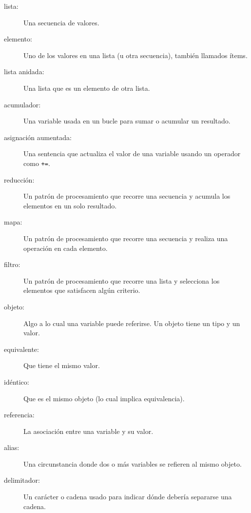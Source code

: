 \documentclass[10pt]{book}
\begin{document}
\begin{description}

\item[lista:] Una secuencia de valores.

\item[elemento:] Uno de los valores en una lista (u otra secuencia),
también llamados ítems.

\item[lista anidada:] Una lista que es un elemento de otra lista.

\item[acumulador:] Una variable usada en un bucle para sumar o
acumular un resultado.

\item[asignación aumentada:] Una sentencia que actualiza el valor
de una variable usando un operador como \verb"+=".

\item[reducción:] Un patrón de procesamiento que recorre una secuencia
y acumula los elementos en un solo resultado.

\item[mapa:] Un patrón de procesamiento que recorre una secuencia y
realiza una operación en cada elemento.

\item[filtro:] Un patrón de procesamiento que recorre una lista y
selecciona los elementos que satisfacen algún criterio.

\item[objeto:] Algo a lo cual una variable puede referirse.  Un objeto
tiene un tipo y un valor.

\item[equivalente:] Que tiene el mismo valor.

\item[idéntico:] Que es el mismo objeto (lo cual implica equivalencia).

\item[referencia:] La asociación entre una variable y su valor.

\item[alias:] Una circunstancia donde dos o más variables se refieren al mismo
objeto.

\item[delimitador:] Un carácter o cadena usado para indicar dónde
debería separarse una cadena.

\end{description}
\end{document}
